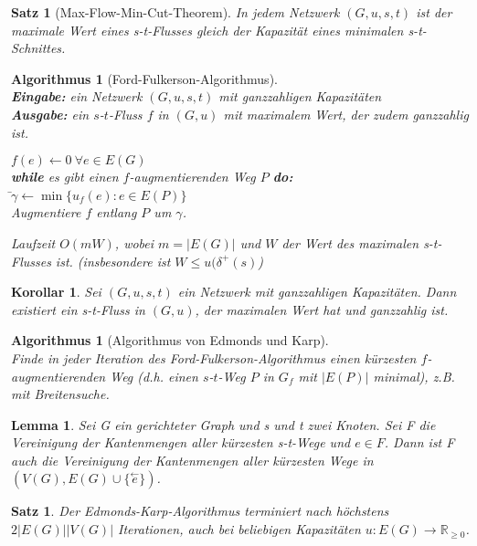 \documentclass[12pt,a4paper]{article}
\theoremstyle{plain}
\newtheorem{Satz}[Theorem]{Satz}
\newtheorem{Lemma}[Theorem]{Lemma}
\newtheorem{Korollar}[Theorem]{Korollar}
\newtheorem{Algorithmus}[Theorem]{Algorithmus}
\newcommand{\R}{\mathbb{R}}
\numberwithin{equation}{section}
\begin{document}
\begin{Satz}[Max-Flow-Min-Cut-Theorem]
In jedem Netzwerk $(G,u,s,t)$ ist der maximale Wert eines s-t-Flusses gleich der Kapazität eines minimalen s-t-Schnittes.
\end{Satz}
\begin{Algorithmus}[Ford-Fulkerson-Algorithmus]\\
\textbf{Eingabe:} ein Netzwerk $(G,u,s,t)$ mit ganzzahligen Kapazitäten\\
\textbf{Ausgabe:} ein $s$-$t$-Fluss $f$ in $(G,u)$ mit maximalem Wert, der zudem ganzzahlig ist.
\begin{tabbing}
$f(e)\leftarrow 0\ \forall e\in E(G)$\\
\textbf{while} es gibt einen $f$-augmentierenden Weg $P$ \textbf{do:}\\
\text{\qquad}\=$\gamma\leftarrow \min\{u_f(e):e\in E(P)\}$\\
\>Augmentiere $f$ entlang $P$ um $\gamma$.
\end{tabbing}
Laufzeit $O(mW)$, wobei $m=|E(G)|$ und $W$ der Wert des maximalen s-t-Flusses ist. (insbesondere ist $W\leq u(\delta^+(s)$)
\end{Algorithmus}
\begin{Korollar}
Sei $(G,u,s,t)$ ein Netzwerk mit ganzzahligen Kapazitäten. Dann existiert ein s-t-Fluss in $(G,u)$, der maximalen Wert hat und ganzzahlig ist.
\end{Korollar}
\begin{Algorithmus}[Algorithmus von Edmonds und Karp]\\
Finde in jeder Iteration des Ford-Fulkerson-Algorithmus einen kürzesten $f$-augmentierenden Weg (d.h. einen $s$-$t$-Weg $P$ in $G_f$ mit $|E(P)|$ minimal), z.B. mit Breitensuche.
\end{Algorithmus}
\begin{Lemma}
Sei G ein gerichteter Graph und s und t zwei Knoten. Sei F die Vereinigung der Kantenmengen aller kürzesten s-t-Wege und $e\in F$. Dann ist F auch die Vereinigung der Kantenmengen aller kürzesten Wege in $(V(G), E(G)\cup \{\stackrel{\leftarrow}{e}\})$.
\end{Lemma}
\begin{Satz}
Der Edmonds-Karp-Algorithmus terminiert nach höchstens $2|E(G)||V(G)|$ Iterationen, auch bei beliebigen Kapazitäten $u: E(G)\rightarrow \R_{\geq 0}$.
\end{Satz}
\end{document}
